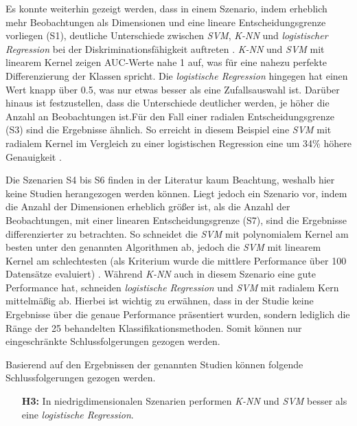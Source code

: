 \documentclass[
]{article}
\begin{document}
Es konnte weiterhin gezeigt werden, dass in einem Szenario, indem
erheblich mehr Beobachtungen als Dimensionen und eine lineare
Entscheidungsgrenze vorliegen (S1), deutliche Unterschiede zwischen
\textit{SVM}, \textit{K-NN} und \textit{logistischer Regression} bei der
Diskriminationsfähigkeit auftreten
\parencite{entezari-malekiComparisonClassificationMethods2009}.
\textit{K-NN} und \textit{SVM} mit linearem Kernel zeigen AUC-Werte nahe
1 auf, was für eine nahezu perfekte Differenzierung der Klassen spricht.
Die \textit{logistische Regression} hingegen hat einen Wert knapp über
0.5, was nur etwas besser als eine Zufallsauswahl ist. Darüber hinaus
ist festzustellen, dass die Unterschiede deutlicher werden, je höher die
Anzahl an Beobachtungen ist.\newline Für den Fall einer radialen
Entscheidungsgrenze (S3) sind die Ergebnisse ähnlich. So erreicht in
diesem Beispiel eine \textit{SVM} mit radialem Kernel im Vergleich zu
einer logistischen Regression eine um 34\% höhere Genauigkeit
\parencite{faveroClassificationPerformanceEvaluation2022}.

Die Szenarien S4 bis S6 finden in der Literatur kaum Beachtung, weshalb
hier keine Studien herangezogen werden können. Liegt jedoch ein Szenario
vor, indem die Anzahl der Dimensionen erheblich größer ist, als die
Anzahl der Beobachtungen, mit einer linearen Entscheidungsgrenze (S7),
sind die Ergebnisse differenzierter zu betrachten. So schneidet die
\textit{SVM} mit polynomialem Kernel am besten unter den genannten
Algorithmen ab, jedoch die \textit{SVM} mit linearem Kernel am
schlechtesten (als Kriterium wurde die mittlere Performance über 100
Datensätze evaluiert)
\parencite{scholzComparisonClassificationMethods2021}. Während
\textit{K-NN} auch in diesem Szenario eine gute Performance hat,
schneiden \textit{logistische Regression} und \textit{SVM} mit radialem
Kern mittelmäßig ab. Hierbei ist wichtig zu erwähnen, dass in der Studie
keine Ergebnisse über die genaue Performance präsentiert wurden, sondern
lediglich die Ränge der 25 behandelten Klassifikationsmethoden. Somit
können nur eingeschränkte Schlussfolgerungen gezogen werden.

Basierend auf den Ergebnissen der genannten Studien können folgende
Schlussfolgerungen gezogen werden.

\begin{minipage}{0.9\linewidth}
\begin{itemize}[leftmargin=0.1\linewidth]
\item[\textbf{H3:}] In niedrigdimensionalen Szenarien performen \textit{K-NN} und \textit{SVM} besser als eine \textit{logistische Regression}.
\end{itemize}
\end{minipage}
\end{document}
